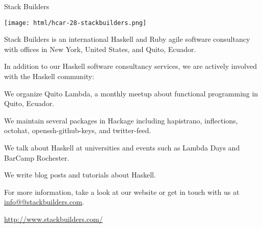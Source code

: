 \begin{hcarentry}{Stack Builders}
\makeheader

\begin{center}
  \texttt{[image: html/hcar-28-stackbuilders.png]}
\end{center}

Stack Builders is an international Haskell and Ruby agile software
consultancy with offices in New York, United States, and Quito,
Ecuador.

In addition to our Haskell software consultancy services, we are
actively involved with the Haskell community:

\begin{compactitem}
\item
  We organize Quito Lambda, a monthly meetup about functional
  programming in Quito, Ecuador.

\item
  We maintain several packages in Hackage including hapistrano,
  inflections, octohat, openssh-github-keys, and twitter-feed.

\item
  We talk about Haskell at universities and events such as Lambda Days
  and BarCamp Rochester.

\item
  We write blog posts and tutorials about Haskell.

\end{compactitem}

For more information, take a look at our website or get in touch with
us at \href{mailto:info@@stackbuilders.com}{info@@stackbuilders.com}.

\FurtherReading
\url{http://www.stackbuilders.com/}
\end{hcarentry}
